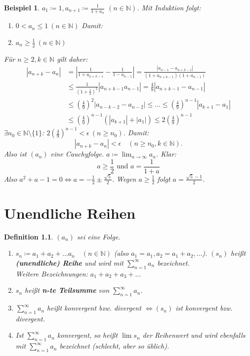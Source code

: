 \documentclass[12pt]{extreport} %
\newcommand{\N}{\mathbb{N}}
\theoremstyle{named}
\theoremstyle{dotless}
\newtheorem*{beispiel*}{Beispiel}
\newtheorem*{definition}{Definition}
\begin{document}
\begin{beispiel*}
	$a_{1} \coloneqq 1, a_{n+1} \coloneqq \frac{1}{1 + a_{n}}$ $(n \in \N)$. Mit Induktion folgt:
	\begin{enumerate}
		\item[1)] $0 < a_{n} \leq 1 ~(n \in \N)$ Damit:
		\item[2)] $a_{n} \geq \frac{1}{2} ~(n \in \N)$
	\end{enumerate}
	Für $n \geq 2, k \in \N$ gilt daher:
	\begin{align*}
		|a_{n+k} - a_{n} | & = \left| \frac{1}{1+a_{n+k-1}} - \frac{1}{1 - a_{n - 1}} \right| = \frac{|a_{n-1} - a_{n +k-1}|}{(1+a_{n+k-1})(1+a_{n-1})} \\
			& \leq \frac{1}{(1+\frac{1}{2})^{2}} |a_{n+k-1} a_{n-1}| = \frac{4}{9} |a_{n+k-1} - a_{n-1}| \\
			& \leq \left(\frac{4}{9} \right)^{2} |a_{n-k-2} - a_{n-2}| \leq \dotsc \leq \left( \frac{4}{9} \right)^{n-1} |a_{k+1} - a_{1}| \\
			& \leq \left( \frac{4}{9} \right)^{n-1} \left( |a_{k+1}| + |a_{1}|\right) \leq 2 \left( \frac{4}{9} \right)^{n-1} 
	\end{align*}
	$\exists n_{0} \in \N \setminus \{ 1 \}$: $2\left(\frac{4}{9}\right)^{n-1} < \epsilon ~(n \geq n_{0})$. Damit: 
		$$ |a_{n+k} - a_{n}| < \epsilon \quad (n \geq n_{0}, k \in \N). $$
	Also ist $(a_{n})$ eine Cauchyfolge. $a \coloneqq \lim_{n \rightarrow \infty} a_{n}$. Klar: 
	$$ a \geq \frac{1}{2} \text{ und } a = \frac{1}{1 + a} $$
	Also $a^{2} + a - 1 = 0 \iff a = - \frac{1}{2} \pm \frac{\sqrt{5}}{2}$. Wegen $a \geq \frac{1}{2}$ folgt $a = \frac{\sqrt{5} - 1}{2}$.
\end{beispiel*}


\newpage


\chapter{Unendliche Reihen}


     
\begin{definition} $(a_{n})$ sei eine Folge.
	\begin{enumerate}
		\item $ s_{n} \coloneqq a_{1} + a_{2} + \dotsc a_{n} \quad (n \in \N)$
		(also $a_{1} = a_{1}, a_{2} = a_{1} + a_{2}, \dotsc$). $(s_{n})$ hei{\ss}t \textbf{(unendliche) Reihe} und wird mit $\sum_{n = 1}^{\infty} a_{n}$ bezeichnet. \\
		Weitere Bezeichnungen: $a_{1} + a_{2} + a_{3} + \dotsc$
		\item $s_{n}$ hei{\ss}t \textbf{n-te Teilsumme} von $\sum_{n=1}^{\infty} a_{n}$.	
		\item $\sum_{n=1}^{\infty} a_{n}$ hei{\ss}t konvergent bzw. divergent $\iff (s_{n})$ ist konvergent 	bzw. divergent.
		\item Ist $\sum_{n = 1}^{\infty} a_{n}$ konvergent, so hei{\ss}t $\lim s_{n}$ der Reihenwert und wird ebenfalls mit $\sum_{n=1}^{\infty} a_{n}$ bezeichnet (schlecht, aber so üblich).
	\end{enumerate} 	
\end{definition}
\end{document}
